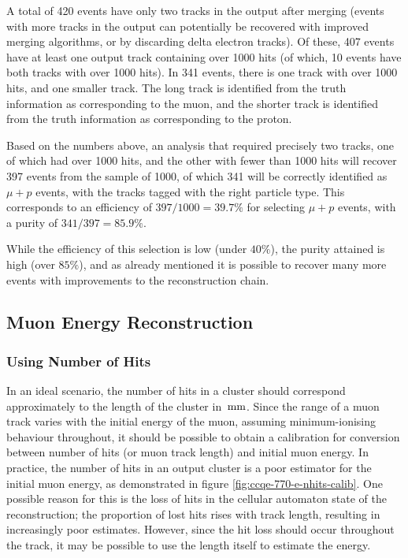 A total of 420 events have only two tracks in the output after merging (events with more tracks in the output can potentially be recovered with improved merging algorithms, or by discarding delta electron tracks). Of these, 407 events have at least one output track containing over 1000 hits (of which, 10 events have both tracks with over 1000 hits). In 341 events, there is one track with over 1000 hits, and one smaller track. The long track is identified from the truth information as corresponding to the muon, and the shorter track is identified from the truth information as corresponding to the proton.

Based on the numbers above, an analysis that required precisely two tracks, one of which had over 1000 hits, and the other with fewer than 1000 hits will recover 397 events from the sample of 1000, of which 341 will be correctly identified as $\mu + p$ events, with the tracks tagged with the right particle type. This corresponds to an efficiency of $397/1000 = 39.7\%$ for selecting $\mu + p$ events, with a purity of $341/397 = 85.9\%$.

While the efficiency of this selection is low (under $40\%$), the purity attained is high (over $85\%$), and as already mentioned it is possible to recover many more events with improvements to the reconstruction chain.

\subsection{Muon Energy Reconstruction}
\subsubsection{Using Number of Hits}
In an ideal scenario, the number of hits in a cluster should correspond approximately to the length of the cluster in $\,\mathrm{mm}$. Since the range of a muon track varies with the initial energy of the muon, assuming minimum-ionising behaviour throughout, it should be possible to obtain a calibration for conversion between number of hits (or muon track length) and initial muon energy. In practice, the number of hits in an output cluster is a poor estimator for the initial muon energy, as demonstrated in figure \ref{fig:ccqe-770-e-nhits-calib}. One possible reason for this is the loss of hits in the cellular automaton state of the reconstruction; the proportion of lost hits rises with track length, resulting in increasingly poor estimates. However, since the hit loss should occur throughout the track, it may be possible to use the length itself to estimate the energy.

